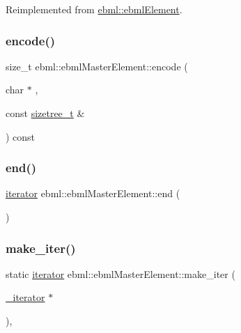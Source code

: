 Reimplemented from \mbox{\hyperlink{classebml_1_1ebmlElement_a5aeddfac34c2c839873146be6c634aed}{ebml\+::ebml\+Element}}.

\mbox{\label{classebml_1_1ebmlMasterElement_af9c776725a15ddff8a66d6c42bb7610f}} 
\subsubsection{\texorpdfstring{encode()}{encode()}\hspace{0.1cm}{\footnotesize\ttfamily [3/3]}}
{\footnotesize\ttfamily size\+\_\+t ebml\+::ebml\+Master\+Element\+::encode (\begin{DoxyParamCaption}\item[{char $\ast$}]{,  }\item[{const \mbox{\hyperlink{structebml_1_1sizetree__t}{sizetree\+\_\+t}} \&}]{ }\end{DoxyParamCaption}) const}

\mbox{\label{classebml_1_1ebmlMasterElement_a9859bf4ba74c58ccc0eef1c9f6017719}} 
\subsubsection{\texorpdfstring{end()}{end()}}
{\footnotesize\ttfamily \mbox{\hyperlink{classebml_1_1ebmlMasterElement_1_1iterator}{iterator}} ebml\+::ebml\+Master\+Element\+::end (\begin{DoxyParamCaption}{ }\end{DoxyParamCaption})}

\mbox{\label{classebml_1_1ebmlMasterElement_a5c9950e1211b1dae82f84c64810317d0}} 
\subsubsection{\texorpdfstring{make\+\_\+iter()}{make\_iter()}\hspace{0.1cm}{\footnotesize\ttfamily [1/2]}}
{\footnotesize\ttfamily static \mbox{\hyperlink{classebml_1_1ebmlMasterElement_1_1iterator}{iterator}} ebml\+::ebml\+Master\+Element\+::make\+\_\+iter (\begin{DoxyParamCaption}\item[{\mbox{\hyperlink{classebml_1_1ebmlMasterElement_1_1__iterator}{\+\_\+iterator}} $\ast$}]{ }\end{DoxyParamCaption})\hspace{0.3cm}{\ttfamily [static]}, {\ttfamily [protected]}}


